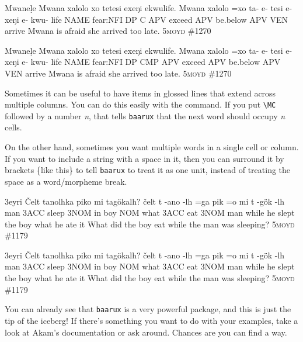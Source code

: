 \begin{examples}
    \ex \label{ex:mwanele}
    \lect Mwaneḷe
    \script Mwana xalolo xo tetesi exeŋi ekwulife.
    \bits Mwana xalolo =xo ta- e- tesi e- xeŋi e- kwu- life
    \gloss NAME fear:NFI DP C APV exceed APV be.below APV VEN arrive
    \tr Mwana is afraid she arrived too late.
    \source \textsc{5moyd} \#1270
\end{examples}

\begin{verbbox}
\begin{examples}
    \ex \label{ex:mwanele}
    \lect Mwaneḷe
    \script Mwana xalolo xo tetesi exeŋi ekwulife.
    \bits Mwana xalolo =xo ta- e- tesi e- xeŋi e- kwu- life
    \gloss NAME fear:NFI DP CMP APV exceed APV be.below APV VEN arrive
    \tr Mwana is afraid she arrived too late.
    \source \textsc{5moyd} \#1270
\end{examples}
\end{verbbox}
\fbox{\theverbbox}

Sometimes it can be useful to have items in glossed lines that extend across multiple columns. You can do this easily with the  command. If you put \texttt{\textbackslash MC} followed by a number \textit{n}, that tells \texttt{baarux} that the next word should occupy \textit{n} cells. 

On the other hand, sometimes you want multiple words in a single cell or column. If you want to include a string with a space in it, then you can surround it by brackets \{like this\} to tell \texttt{baarux} to treat it as one unit, instead of treating the space as a word/morpheme break.

\begin{examples}
    \ex
    \lect 3eyri
    \words Čelt  tanolhka  piko mi  tagökalh?
    \bits čelt t -ano  -lh =ga pik =o mi t -gök -lh
    \gloss man 3ACC sleep 3NOM in boy NOM what 3ACC eat 3NOM
    \gloss man  {while he slept}  {the boy} what  {he ate it}
    \tr What did the boy eat while the man was sleeping?
    \source \textsc{5moyd} \#1179
\end{examples}

\begin{verbbox}
\begin{examples}
    \ex
    \lect 3eyri
    \words Čelt  tanolhka  piko mi  tagökalh?
    \bits čelt t -ano  -lh =ga pik =o mi t -gök -lh
    \gloss man 3ACC sleep 3NOM in boy NOM what 3ACC eat 3NOM
    \gloss man  {while he slept}  {the boy} what  {he ate it}
    \tr What did the boy eat while the man was sleeping?
    \source \textsc{5moyd} \#1179
\end{examples}
\end{verbbox}
\fbox{\theverbbox}

You can already see that \texttt{baarux} is a very powerful package, and this is just the tip of the iceberg! If there's something you want to do with your examples, take a look at Akam's documentation or ask around. Chances are you can find a way.


\newpage
\mbox{}
\newpage

\pagestyle{fancy}